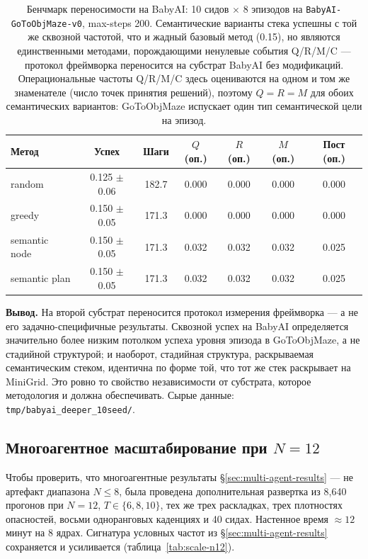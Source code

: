 \documentclass{article}
\begin{document}
\begin{table}[h]
\centering
\caption{Бенчмарк переносимости на BabyAI: 10 сидов $\times$ 8 эпизодов на \texttt{BabyAI-GoToObjMaze-v0}, max-steps 200. Семантические варианты стека успешны с той же сквозной частотой, что и жадный базовый метод (0.15), но являются единственными методами, порождающими ненулевые события Q/R/M/C --- протокол фреймворка переносится на субстрат BabyAI без модификаций. Операциональные частоты Q/R/M/C здесь оцениваются на одном и том же знаменателе (число точек принятия решений), поэтому $Q{=}R{=}M$ для обоих семантических вариантов: GoToObjMaze испускает один тип семантической цели на эпизод.}
\label{tab:babyai-deeper}
\small
\begin{tabular}{l c c c c c c}
\toprule
Метод & Успех & Шаги & $Q$ (оп.) & $R$ (оп.) & $M$ (оп.) & Пост (оп.) \\
\midrule
random         & 0.125 $\pm$ 0.06 & 182.7 & 0.000 & 0.000 & 0.000 & 0.000 \\
greedy         & 0.150 $\pm$ 0.05 & 171.3 & 0.000 & 0.000 & 0.000 & 0.000 \\
semantic node  & 0.150 $\pm$ 0.05 & 171.3 & 0.032 & 0.032 & 0.032 & 0.025 \\
semantic plan  & 0.150 $\pm$ 0.05 & 171.3 & 0.032 & 0.032 & 0.032 & 0.025 \\
\bottomrule
\end{tabular}
\end{table}

\textbf{Вывод.} На второй субстрат переносится протокол измерения фреймворка --- а не его задачно-специфичные результаты. Сквозной успех на BabyAI определяется значительно более низким потолком успеха уровня эпизода в GoToObjMaze, а не стадийной структурой; и наоборот, стадийная структура, раскрываемая семантическим стеком, идентична по форме той, что тот же стек раскрывает на MiniGrid. Это ровно то свойство независимости от субстрата, которое методология и должна обеспечивать. Сырые данные: \texttt{tmp/babyai\_deeper\_10seed/}.

\subsection{Многоагентное масштабирование при $N=12$}
\label{app:scale-N12}

Чтобы проверить, что многоагентные результаты \S\ref{sec:multi-agent-results} --- не артефакт диапазона $N\!\le\!8$, была проведена дополнительная развертка из 8{,}640 прогонов при $N\!=\!12$, $T \in \{6, 8, 10\}$, тех же трех раскладках, трех плотностях опасностей, восьми одноранговых каденциях и 40 сидах. Настенное время $\approx 12$ минут на 8 ядрах. Сигнатура условных частот из \S\ref{sec:multi-agent-results} сохраняется и усиливается (таблица~\ref{tab:scale-n12}).
\end{document}
